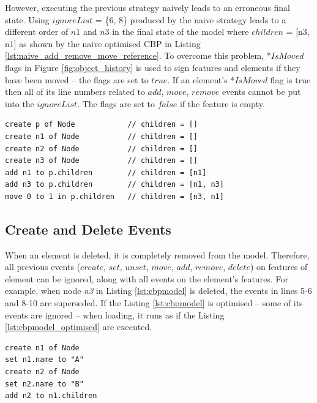 {However, executing the previous strategy naively leads to an erroneous final state. Using $ignoreList$ = \{6, 8\} produced by the naive strategy leads to a different order of $n1$ and $n3$ in the final state of the model where $children$ = [n3, n1] as shown by the naive optimised CBP in Listing \ref{lst:naive_add_remove_move_reference}. To overcome this problem, *$IsMoved$ flags in Figure \ref{fig:object_history} is used to sign  features and elements if they have been moved -- the flags are set to $true$. If an element's *$IsMoved$ flag is true then all of its line numbers related to $add$, $move$, $remove$ events cannot be put into the $ignoreList$. The flags are set to $false$ if the feature is empty. 

\vspace{-20pt}
\begin{lstlisting}[style=eol,caption={A naive optimised CBP representation of original CBP representation in Listing \ref{lst:add_remove_move_reference} .},label=lst:naive_add_remove_move_reference]
create p of Node            // children = []
create n1 of Node           // children = []
create n2 of Node           // children = []
create n3 of Node           // children = []
add n1 to p.children        // children = [n1]
add n3 to p.children        // children = [n1, n3]
move 0 to 1 in p.children   // children = [n3, n1]
\end{lstlisting}

\subsection{Create and Delete Events}
\label{subsec:create_and_delete_operations}

When an element is deleted, it is completely removed from the model. Therefore, all previous events ($create$, $set$, $unset$, $move$, $add$, $remove$, $delete$) on features of element can be ignored, along with all events on the element's features. For example, when node \emph{n3} in Listing \ref{lst:cbpmodel} is deleted, the events in lines 5-6 and 8-10 are superseded. If the Listing \ref{lst:cbpmodel} is optimised -- some of its events are ignored -- when loading, it runs as if the Listing \ref{lst:cbpmodel_optimised} are executed.

\vspace{-20pt}
\begin{lstlisting}[style=eol,caption={Change-based representation of the model in Figure \ref{fig:initial_model} after removal of node $n3$.},label=lst:cbpmodel_optimised]
create n1 of Node
set n1.name to "A"
create n2 of Node
set n2.name to "B"
add n2 to n1.children
\end{lstlisting}

}
